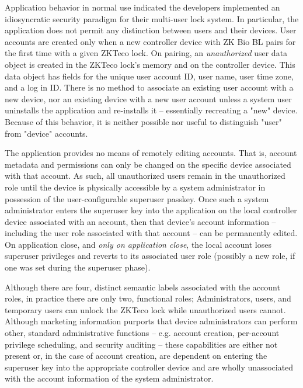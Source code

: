 \documentclass[conference]{IEEEtran}
\begin{document}
Application behavior in normal use indicated the developers implemented an idiosyncratic security paradigm for their multi-user lock system.  In particular, the application does not permit any distinction between users and their devices.  User accounts are created only when a new controller device with ZK Bio BL pairs for the first time with a given ZKTeco lock.  On pairing, an \textit{unauthorized} user data object is created in the ZKTeco lock's memory and on the controller device.  This data object has fields for the unique user account ID, user name, user time zone, and a log in ID.  There is no method to associate an existing user account with a new device, nor an existing device with a new user account unless a system user uninstalls the application and re-installs it -- essentially recreating a "new" device.  Because of this behavior, it is neither possible nor useful to distinguish "user" from "device" accounts.

\bigskip

The application provides no means of remotely editing accounts.  That is, account metadata and permissions can only be changed on the specific device associated with that account. As such, all unauthorized users remain in the unauthorized role until the device is physically accessible by a system administrator in possession of the user-configurable superuser passkey.  Once such a system administrator enters the superuser key into the application on the local controller device associated with an account, then that device's account information -- including the user role associated with that account -- can be permanently edited.  On application close, and \textit{only on application close}, the local account loses superuser privileges and reverts to its associated user role (possibly a new role, if one was set during the superuser phase).

\bigskip

Although there are four, distinct semantic labels associated with the account roles, in practice there are only two, functional roles;  Administrators, users, and temporary users can unlock the ZKTeco lock while unauthorized users cannot.  Although marketing information purports that device administrators can perform other, standard administrative functions -- e.g. account creation, per-account privilege scheduling, and security auditing -- these capabilities are either not present or, in the case of account creation, are dependent on entering the superuser key into the appropriate controller device and are wholly unassociated with the account information of the system administrator.
\end{document}
